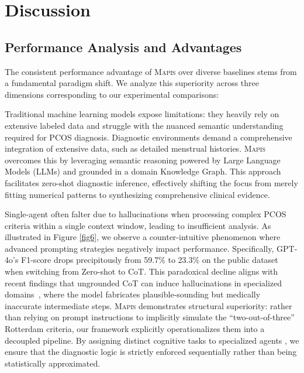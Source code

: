 \documentclass[a4paper,fleqn]{cas-dc}
\begin{document}
\section{Discussion}

\subsection{Performance Analysis and Advantages}
The consistent performance advantage of \textsc{Mapis} over diverse baselines stems from a fundamental paradigm shift. We analyze this superiority across three dimensions corresponding to our experimental comparisons:

Traditional machine learning models expose limitations: they heavily rely on extensive labeled data and struggle with the nuanced semantic understanding required for PCOS diagnosis. Diagnostic environments demand a comprehensive integration of extensive data, such as detailed menstrual histories. \textsc{Mapis} overcomes this by leveraging semantic reasoning powered by Large Language Models (LLMs) and grounded in a domain Knowledge Graph. This approach facilitates zero-shot diagnostic inference, effectively shifting the focus from merely fitting numerical patterns to synthesizing comprehensive clinical evidence.

Single-agent often falter due to hallucinations when processing complex PCOS criteria within a single context window, leading to insufficient analysis. As illustrated in Figure \ref{fig6}, we observe a counter-intuitive phenomenon where advanced prompting strategies negatively impact performance. Specifically, GPT-4o's F1-score drops precipitously from 59.7\% to 23.3\% on the public dataset when switching from Zero-shot to CoT. This paradoxical decline aligns with recent findings that ungrounded CoT can induce hallucinations in specialized domains~\cite{tang-etal-2024-medagents,bubeck2023sparks}, where the model fabricates plausible-sounding but medically inaccurate intermediate steps. \textsc{Mapis} demonstrates structural superiority: rather than relying on prompt instructions to implicitly simulate the ``two-out-of-three'' Rotterdam criteria, our framework explicitly operationalizes them into a decoupled pipeline. By assigning distinct cognitive tasks to specialized agents , we ensure that the diagnostic logic is strictly enforced sequentially rather than being statistically approximated.
\end{document}
